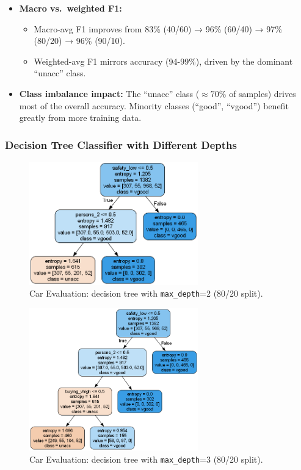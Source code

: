 \begin{itemize}
\begin{itemize}
	      \end{itemize}
	\item \textbf{Macro vs.\ weighted F1:}
	      \begin{itemize}
		      \item Macro-avg F1 improves from 83\% (40/60) → 96\% (60/40) → 97\% (80/20) → 96\% (90/10).
		      \item Weighted-avg F1 mirrors accuracy (94-99\%), driven by the dominant “unacc” class.
	      \end{itemize}
	\item \textbf{Class imbalance impact:} The “unacc” class (\(\approx70\%\) of samples) drives most of the overall accuracy. Minority classes (“good”, “vgood”) benefit greatly from more training data.
\end{itemize}

\clearpage
\subsubsection*{Decision Tree Classifier with Different Depths}
\begin{figure}[H]
	\centering
	\includegraphics[width=0.65\textwidth]{imgs/dt-mini/dt__car_evaluation__80_vs_20__2.png}
	\caption{Car Evaluation: decision tree with \texttt{max\_depth}=2 (80/20 split).}\label{fig:ce-dt-depth-2}
\end{figure}

\begin{figure}[H]
	\centering
	\includegraphics[width=0.65\textwidth]{imgs/dt-mini/dt__car_evaluation__80_vs_20__3.png}
	\caption{Car Evaluation: decision tree with \texttt{max\_depth}=3 (80/20 split).}\label{fig:ce-dt-depth-3}
\end{figure}

